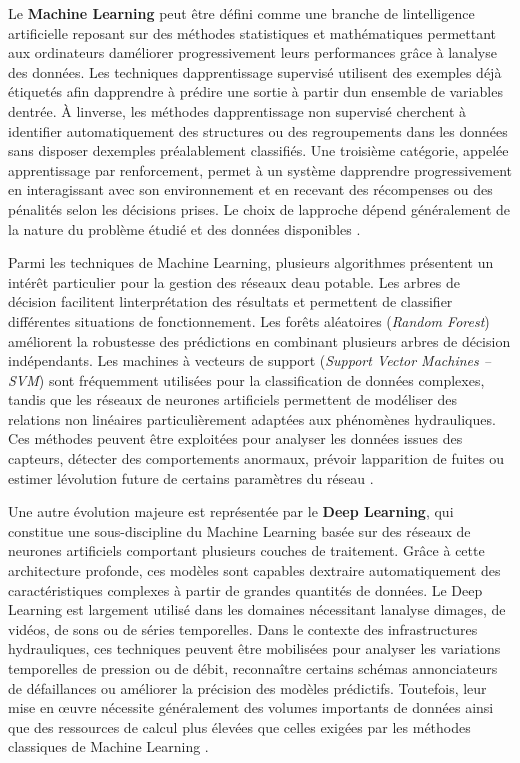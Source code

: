 \documentclass[12pt,a4paper,oneside]{report}
\begin{document}
Le \textbf{Machine Learning} peut être défini comme une branche de
l\textquotesingle intelligence artificielle reposant sur des méthodes
statistiques et mathématiques permettant aux ordinateurs
d\textquotesingle améliorer progressivement leurs performances grâce à
l\textquotesingle analyse des données. Les techniques
d\textquotesingle apprentissage supervisé utilisent des exemples déjà
étiquetés afin d\textquotesingle apprendre à prédire une sortie à partir
d\textquotesingle un ensemble de variables d\textquotesingle entrée. À
l\textquotesingle inverse, les méthodes d\textquotesingle apprentissage
non supervisé cherchent à identifier automatiquement des structures ou
des regroupements dans les données sans disposer
d\textquotesingle exemples préalablement classifiés. Une troisième
catégorie, appelée apprentissage par renforcement, permet à un système
d\textquotesingle apprendre progressivement en interagissant avec son
environnement et en recevant des récompenses ou des pénalités selon les
décisions prises. Le choix de l\textquotesingle approche dépend
généralement de la nature du problème étudié et des données disponibles
\cite{ref70}.

Parmi les techniques de Machine Learning, plusieurs algorithmes
présentent un intérêt particulier pour la gestion des réseaux
d\textquotesingle eau potable. Les arbres de décision facilitent
l\textquotesingle interprétation des résultats et permettent de
classifier différentes situations de fonctionnement. Les forêts
aléatoires (\emph{Random Forest}) améliorent la robustesse des
prédictions en combinant plusieurs arbres de décision indépendants. Les
machines à vecteurs de support (\emph{Support Vector Machines -- SVM})
sont fréquemment utilisées pour la classification de données complexes,
tandis que les réseaux de neurones artificiels permettent de modéliser
des relations non linéaires particulièrement adaptées aux phénomènes
hydrauliques. Ces méthodes peuvent être exploitées pour analyser les
données issues des capteurs, détecter des comportements anormaux,
prévoir l\textquotesingle apparition de fuites ou estimer
l\textquotesingle évolution future de certains paramètres du réseau
\cite{ref71}.

Une autre évolution majeure est représentée par le \textbf{Deep
Learning}, qui constitue une sous-discipline du Machine Learning basée
sur des réseaux de neurones artificiels comportant plusieurs couches de
traitement. Grâce à cette architecture profonde, ces modèles sont
capables d\textquotesingle extraire automatiquement des caractéristiques
complexes à partir de grandes quantités de données. Le Deep Learning est
largement utilisé dans les domaines nécessitant
l\textquotesingle analyse d\textquotesingle images, de vidéos, de sons
ou de séries temporelles. Dans le contexte des infrastructures
hydrauliques, ces techniques peuvent être mobilisées pour analyser les
variations temporelles de pression ou de débit, reconnaître certains
schémas annonciateurs de défaillances ou améliorer la précision des
modèles prédictifs. Toutefois, leur mise en œuvre nécessite généralement
des volumes importants de données ainsi que des ressources de calcul
plus élevées que celles exigées par les méthodes classiques de Machine
Learning \cite{ref72}.
\end{document}
